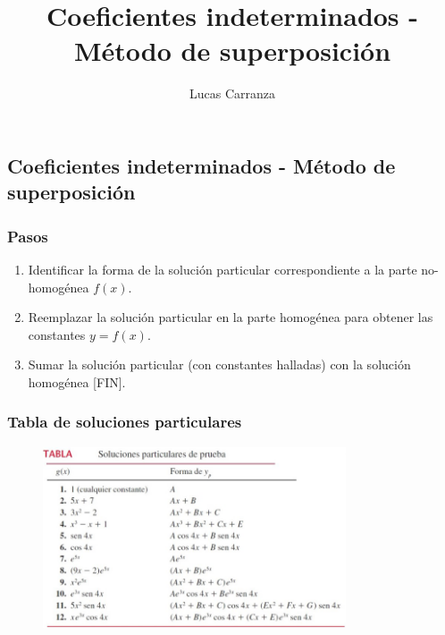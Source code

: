 \documentclass{report}
\title{\Huge{Coeficientes indeterminados - Método de superposición}}
\author{\huge{Lucas Carranza}}
\date{}
\begin{document}
\maketitle
\newpage

\chapter{}
\section{Coeficientes indeterminados - Método de superposición}

\subsection{Pasos}

\begin{enumerate}
\item Identificar la forma de la solución particular correspondiente a la parte no-homogénea $f(x)$.

\item Reemplazar la solución particular en la parte homogénea para obtener las constantes $y = f(x)$.

\item Sumar la solución particular (con constantes halladas) con la solución homogénea [FIN].
\end{enumerate}


\subsection{Tabla de soluciones particulares}

\begin{figure}[h]
    \centering
    \includegraphics[width=0.8\textwidth]{tabla.png}
\end{figure}
\end{document}
